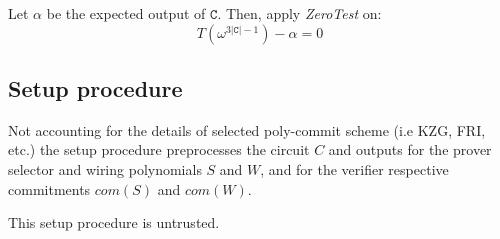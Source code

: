 \documentclass[../lecture-notes.tex]{subfiles}
\begin{document}
Let \(\alpha\) be the expected output of \(\texttt{C}\). Then, apply \textit{ZeroTest} on:
\[T(\omega^{3 |\texttt{C}| - 1}) - \alpha = 0\]

\subsection{Setup procedure}

Not accounting for the details of selected poly-commit scheme (i.e KZG, FRI, etc.) the setup procedure preprocesses the circuit \(C\) and outputs for the prover selector and wiring polynomials \(S\) and \(W\), and for the verifier respective commitments \(com(S)\) and \(com(W)\).

\begin{remark}
This setup procedure is untrusted.
\end{remark}
\end{document}
